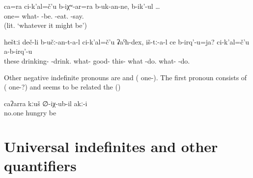 \begin{exe}
	\ex	\label{saying that they will also eat no matter what} 
	\gll	ca=ra	ci-k'al=č'u	b-iχʷ-ar=ra	b-uk-an-ne,	b-ik'-ul	…\\
		one=	what-	-be.	-eat.	-say.\\
	\glt	{} (lit. `whatever it might be')
	
		\ex	\label{The ones who are drinking anything good, what do they do? They do not do anything (good).} 
	\gll	heštːi	deč-li	b-učː-an-t-a-l	ci-k'al=č'u	ʡaˁħ-dex,	iš-tː-a-l	ce	b-irq'-u=ja?		ci-k'al=č'u	a-b-irq'-u\\
		these	drinking-	-drink.	what-	good-	this-	what	-do.		what-	-do.\\
	\glt	{} 
	\end{exe}

Other negative indefinite pronouns are   and   ( one-). The first pronoun consists of ( one-?) and seems to be related the    ()

\begin{exe}
	\ex	\label{ex:No one was hungry}
	\gll	caʔarra	kːuš	∅-iχ-ub-il	akː-i\\
		no.one	hungry	be	\\
	\glt	{}
\end{exe}



\section{Universal indefinites and other quantifiers}
\label{sec:Universal indefinites and other quantifiers}


